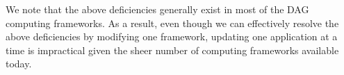 
We note that the above deficiencies generally exist in most of the DAG computing frameworks. 
As a result, even though we can effectively resolve the above deficiencies by modifying one framework, updating one application at a time is impractical given the sheer number of computing frameworks available today.


